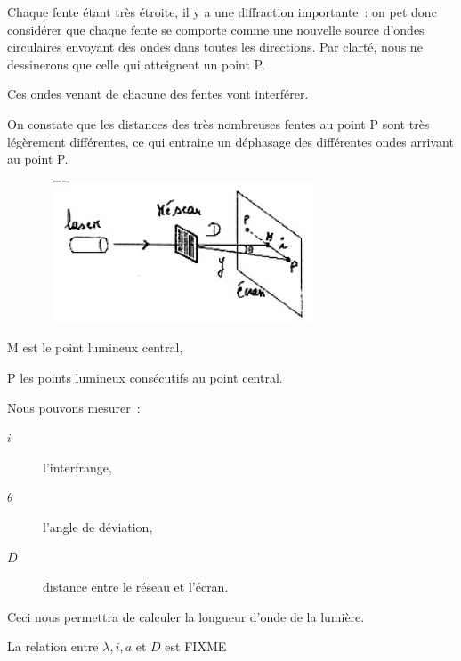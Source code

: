Chaque fente étant très étroite, il y a une diffraction importante~: on
pet donc considérer que chaque fente se comporte comme une nouvelle
source d'ondes circulaires envoyant des ondes dans toutes les
directions. Par clarté, nous ne dessinerons que celle qui atteignent un
point P.

Ces ondes venant de chacune des fentes vont interférer.

On constate que les distances des très nombreuses fentes au point P sont
très légèrement différentes, ce qui entraine un déphasage des
différentes ondes arrivant au point P.

\begin{figure}
\centering
\includegraphics[width=8.348cm,height=4.235cm]{Pictures/10000001000000F800000088FE88597F2483A271.png}
\caption{}
\end{figure}

M est le point lumineux central,

P les points lumineux consécutifs au point central.

Nous pouvons mesurer~:
\begin{description}
	\item[$i$] l'interfrange,
	\item[$\theta$] l'angle de déviation,
	\item[$D$] distance entre le réseau et l'écran.
\end{description}

Ceci nous permettra de calculer la longueur d'onde de la lumière.

La relation entre $\lambda, i, a$ et $D$ est FIXME

